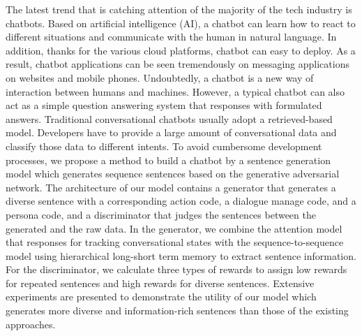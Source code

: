 The latest trend that is catching attention of the majority of the tech industry is chatbots. Based on artificial intelligence (AI), a chatbot can learn how to react to different situations and communicate with the human in natural language. In addition, thanks for the various cloud platforms, chatbot can easy to deploy. As a result, chatbot applications can be seen tremendously on messaging applications on websites and mobile phones. Undoubtedly, a chatbot is a new way of interaction between humans and machines. However, a typical chatbot can also act as a simple question answering system that responses with formulated answers. Traditional conversational chatbots usually adopt a retrieved-based model. Developers have to provide a large amount of conversational data and classify those data to different intents. To avoid cumbersome development processes, we propose a method to build a chatbot by a sentence generation model which generates sequence sentences based on the generative adversarial network. The architecture of our model contains a generator that generates a diverse sentence with a corresponding action code, a dialogue manage code, and a persona code, and a discriminator that judges the sentences between the generated and the raw data. In the generator, we combine the attention model that responses for tracking conversational states with the sequence-to-sequence model using hierarchical long-short term memory to extract sentence information. For the discriminator, we calculate three types of rewards to assign low rewards for repeated sentences and high rewards for diverse sentences. Extensive experiments are presented to demonstrate the utility of our model which generates more diverse and information-rich sentences than those of the existing approaches.